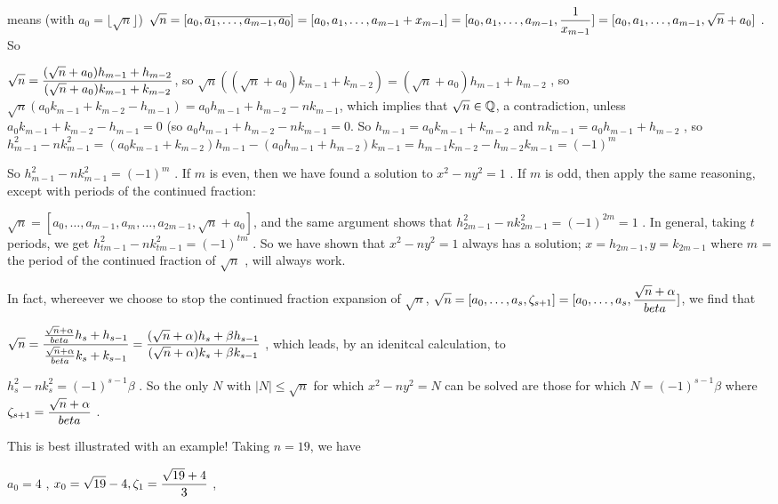 means (with $a_0=\lfloor\sqrt{n}\rfloor$) 
$\displaystyle \sqrt{n}  = [a_0,\overline{a_1,\ldots,a_{m-1},a_0}] = 
[a_0,a_1,\ldots,a_{m-1}+x_{m-1}] = [a_0,a_1,\ldots,a_{m-1},{{1}\over{x_{m-1}}}]
= [a_0,a_1,\ldots,a_{m-1},\sqrt{n}+a_0]$  . So

$\displaystyle \sqrt{n} = {{(\sqrt{n}+a_0)h_{m-1} + h_{m-2}}\over{(\sqrt{n}+a_0)k_{m-1} + k_{m-2}}}$, 
so  $\sqrt{n}((\sqrt{n}+a_0)k_{m-1} + k_{m-2}) = (\sqrt{n}+a_0)h_{m-1} + h_{m-2}$ , so 
$\sqrt{n}(a_0k_{m-1} + k_{m-2} -h_{m-1}) = a_0h_{m-1}+h_{m-2}-nk_{m-1}$, which implies
that $\sqrt{n}\in{\Bbb Q}$, a contradiction, unless $a_0k_{m-1} + k_{m-2} -h_{m-1} = 0$ (so 
$a_0h_{m-1}+h_{m-2}-nk_{m-1} = 0$. 
So $h_{m-1} = a_0k_{m-1} + k_{m-2}$ and $nk_{m-1} = a_0h_{m-1}+h_{m-2}$ , so 
$h_{m-1}^2-nk_{m-1}^2 = (a_0k_{m-1} + k_{m-2})h_{m-1} - (a_0h_{m-1}+h_{m-2})k_{m-1}
= h_{m-1}k_{m-2} - h_{m-2}k_{m-1} = (-1)^m$

So $h_{m-1}^2-nk_{m-1}^2 = (-1)^m$ . If $m$ is even, then we have found a solution to
$x^2-ny^2=1$ . If $m$ is odd, then apply the same reasoning, except with 
periods of the continued fraction: 

$\sqrt{n} = [a_0,\ldots,a_{m-1},a_m,\ldots,a_{2m-1},\sqrt{n}+a_0]$, and the same argument shows
that $h_{2m-1}^2-nk_{2m-1}^2 = (-1)^{2m} = 1$ . In general, taking $t$ periods, we get
$h_{tm-1}^2-nk_{tm-1}^2 = (-1)^{tm}$ . So we have shown that $x^2-ny^2=1$ always has a solution;
$x=h_{2m-1}, y=k_{2m-1}$ where $m$ = the period of the continued fraction of $\sqrt{n}$ , will
always work.

\ssk

In fact, whereever we choose to stop the continued fraction expansion of $\sqrt{n}$, 
$\displaystyle \sqrt{n} = [a_0,\ldots,a_s,\zeta_{s+1}] = [a_0,\ldots,a_s,{{\sqrt{n}+\alpha}\over{beta}}]$, we
find that 

$\displaystyle \sqrt{n} = 
{{{{\sqrt{n}+\alpha}\over{beta}}h_s+h_{s-1}}\over{{{\sqrt{n}+\alpha}\over{beta}}k_s+k_{s-1}}}
= {{(\sqrt{n}+\alpha)h_s+\beta h_{s-1}}\over{(\sqrt{n}+\alpha)k_s+\beta k_{s-1}}}$ , which 
leads, by an idenitcal calculation, to 

$h_s^2-nk_s^2 = (-1)^{s-1}\beta$ . So the only $N$ with $|N|\leq \sqrt{n}$ for which $x^2-ny^2=N$
can be solved are those for which $N = (-1)^{s-1}\beta$ where 
$\displaystyle \zeta_{s+1} = {{\sqrt{n}+\alpha}\over{beta}}$ . 

\msk

This is best illustrated with an example! Taking $n=19$, we have

$a_0=4$ , $\displaystyle x_0=\sqrt{19}-4, \zeta_1 = {{\sqrt{19}+4}\over{3}}$ , 

